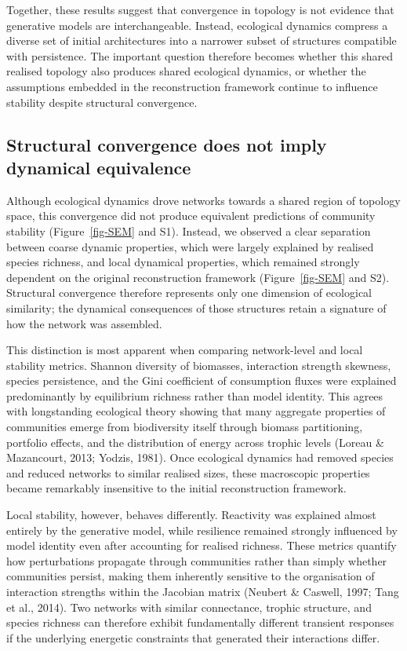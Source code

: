 \documentclass[
]{article}
\begin{document}
Together, these results suggest that convergence in topology is not
evidence that generative models are interchangeable. Instead, ecological
dynamics compress a diverse set of initial architectures into a narrower
subset of structures compatible with persistence. The important question
therefore becomes whether this shared realised topology also produces
shared ecological dynamics, or whether the assumptions embedded in the
reconstruction framework continue to influence stability despite
structural convergence.

\subsection{Structural convergence does not imply dynamical
equivalence}\label{structural-convergence-does-not-imply-dynamical-equivalence}

Although ecological dynamics drove networks towards a shared region of
topology space, this convergence did not produce equivalent predictions
of community stability (Figure~\ref{fig-SEM} and S1). Instead, we
observed a clear separation between coarse dynamic properties, which
were largely explained by realised species richness, and local dynamical
properties, which remained strongly dependent on the original
reconstruction framework (Figure~\ref{fig-SEM} and S2). Structural
convergence therefore represents only one dimension of ecological
similarity; the dynamical consequences of those structures retain a
signature of how the network was assembled.

This distinction is most apparent when comparing network-level and local
stability metrics. Shannon diversity of biomasses, interaction strength
skewness, species persistence, and the Gini coefficient of consumption
fluxes were explained predominantly by equilibrium richness rather than
model identity. This agrees with longstanding ecological theory showing
that many aggregate properties of communities emerge from biodiversity
itself through biomass partitioning, portfolio effects, and the
distribution of energy across trophic levels (Loreau \& Mazancourt,
2013; Yodzis, 1981). Once ecological dynamics had removed species and
reduced networks to similar realised sizes, these macroscopic properties
became remarkably insensitive to the initial reconstruction framework.

Local stability, however, behaves differently. Reactivity was explained
almost entirely by the generative model, while resilience remained
strongly influenced by model identity even after accounting for realised
richness. These metrics quantify how perturbations propagate through
communities rather than simply whether communities persist, making them
inherently sensitive to the organisation of interaction strengths within
the Jacobian matrix (Neubert \& Caswell, 1997; Tang et al., 2014). Two
networks with similar connectance, trophic structure, and species
richness can therefore exhibit fundamentally different transient
responses if the underlying energetic constraints that generated their
interactions differ.
\end{document}
